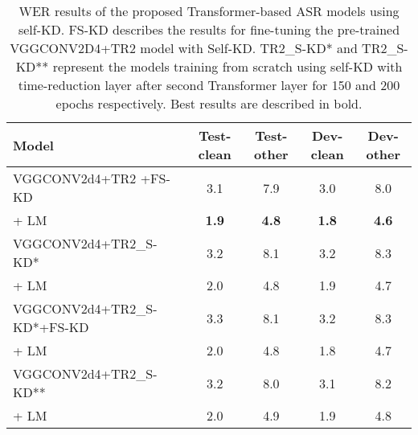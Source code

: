 \documentclass{article}
\begin{document}
\begin{table*}[ht]
\caption{WER results of the proposed Transformer-based ASR models using self-KD. FS-KD describes the results for fine-tuning the pre-trained VGGCONV2D4+TR2 model with Self-KD. TR2\_S-KD* and TR2\_S-KD** represent the models training from scratch using self-KD with   time-reduction layer after second Transformer layer for 150 and 200 epochs respectively. Best results are described in bold.}
\label{tab:s-kdresults}
\vskip 0.1in
\begin{center}
\begin{small}
\begin{sc}
\begin{tabular}{lcccc}
\toprule
    Model       &Test-clean&Test-other&Dev-clean&Dev-other \\
\midrule
     VGGCONV2d4+TR2 +FS-KD& 3.1& 7.9 &3.0  & 8.0 \\
    \hspace{0.5cm}   + LM &\textbf{1.9} &\textbf{4.8} &\textbf{1.8} &\textbf{4.6}\\
     VGGCONV2d4+TR2\_S-KD* & 3.2& 8.1 &3.2  & 8.3 \\
    \hspace{0.5cm}   + LM & 2.0&4.8 &1.9 &4.7\\
     VGGCONV2d4+TR2\_S-KD*+FS-KD & 3.3& 8.1 &3.2  & 8.3 \\
    \hspace{0.5cm}   + LM &2.0 &4.8 &1.8 &4.7\\ 
    VGGCONV2d4+TR2\_S-KD**  & 3.2& 8.0 &3.1  & 8.2 \\
    \hspace{0.5cm}   + LM &2.0 &4.9 & 1.9&4.8\\
\bottomrule
\end{tabular}
\end{sc}
\end{small}
\end{center}
\vskip -0.1in
\end{table*}
\end{document}
